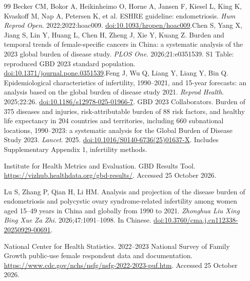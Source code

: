 \documentclass[11pt,a4paper]{article}
\begin{document}
{\small\doublespacing
\begin{thebibliography}{99}
Becker CM, Bokor A, Heikinheimo O, Horne A, Jansen F, Kiesel L, King K, Kvaskoff M, Nap A, Petersen K, et al. ESHRE guideline: endometriosis. \emph{Hum Reprod Open}. 2022;2022:hoac009. \href{https://doi.org/10.1093/hropen/hoac009}{doi:10.1093/hropen/hoac009}.Chen S, Yang X, Jiang S, Lin Y, Huang L, Chen H, Zheng J, Xie Y, Kuang Z. Burden and temporal trends of female-specific cancers in China: a systematic analysis of the 2023 global burden of disease study. \emph{PLOS One}. 2026;21:e0351539. S1 Table: reproduced GBD 2023 standard population. \href{https://doi.org/10.1371/journal.pone.0351539}{doi:10.1371/journal.pone.0351539}.Feng J, Wu Q, Liang Y, Liang Y, Bin Q. Epidemiological characteristics of infertility, 1990--2021, and 15-year forecasts: an analysis based on the global burden of disease study 2021. \emph{Reprod Health}. 2025;22:26. \href{https://doi.org/10.1186/s12978-025-01966-7}{doi:10.1186/s12978-025-01966-7}. GBD 2023 Collaborators. Burden of 375 diseases and injuries, risk-attributable burden of 88 risk factors, and healthy life expectancy in 204 countries and territories, including 660 subnational locations, 1990--2023: a systematic analysis for the Global Burden of Disease Study 2023. \emph{Lancet}. 2025. \href{https://doi.org/10.1016/S0140-6736(25)01637-X}{doi:10.1016/S0140-6736(25)01637-X}. Includes Supplementary Appendix 1, infertility methods.

 Institute for Health Metrics and Evaluation. GBD Results Tool. \url{https://vizhub.healthdata.org/gbd-results/}. Accessed 25 October 2026.

 Lu S, Zhang P, Qian H, Li HM. Analysis and projection of the disease burden of endometriosis and polycystic ovary syndrome-related infertility among women aged 15--49 years in China and globally from 1990 to 2021. \emph{Zhonghua Liu Xing Bing Xue Za Zhi}. 2026;47:1091--1098. In Chinese. \href{https://doi.org/10.3760/cma.j.cn112338-20250929-00691}{doi:10.3760/cma.j.cn112338-20250929-00691}.

 National Center for Health Statistics. 2022--2023 National Survey of Family Growth public-use female respondent data and documentation. \url{https://www.cdc.gov/nchs/nsfg/nsfg-2022-2023-puf.htm}. Accessed 25 October 2026.


\end{thebibliography}}
\end{document}
